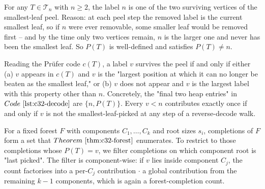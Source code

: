 \begin{observation}
For any \(T\in\mathcal{T}_n\) with \(n\ge 2\), the label \(n\) is one of the
two surviving vertices of the smallest-leaf peel.  Reason: at each peel step
the removed label is the current smallest leaf, so if \(n\) were ever
removable, some smaller leaf would be removed first -- and by the time only
two vertices remain, \(n\) is the larger one and never has been the smallest
leaf.  So \(P(T)\) is well-defined and satisfies \(P(T)\ne n\).
\end{observation}
\begin{observation}
Reading the Pr\"ufer code \(c(T)\), a label \(v\) survives the peel if and
only if either (a) \(v\) appears in \(c(T)\) and \(v\) is the "largest
position at which it can no longer be beaten as the smallest leaf," or
(b) \(v\) does not appear and \(v\) is the largest label with this property
other than \(n\).  Concretely, the "final two heap entries" in \(\coderef
{c32-decode}\) are \(\{n, P(T)\}\).  Every \(v<n\) contributes exactly once
if and only if \(v\) is not the smallest-leaf-picked at any step of a
reverse-decode walk.
\end{observation}
\begin{observation}
For a fixed forest \(F\) with components \(C_1,\dots,C_k\) and root sizes
\(s_i\), completions of \(F\) form a set that \(\thmref{c32-forest}\)
enumerates.  To restrict to those completions whose \(P(T)=v\), we filter
completions on which component root is "last picked".  The filter is
component-wise: if \(v\) lies inside component \(C_j\), the count factorises
into a per-\(C_j\) contribution \(\cdot\) a global contribution from the
remaining \(k-1\) components, which is again a forest-completion count.
\end{observation}

\begin{thinkbox}
\end{thinkbox}

